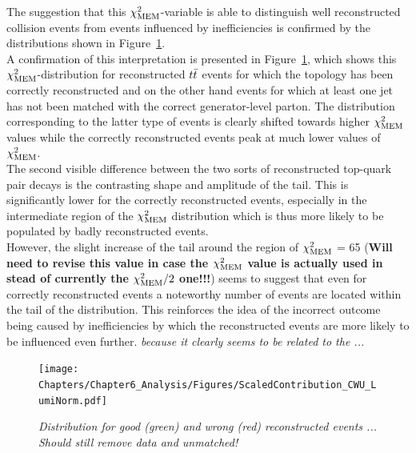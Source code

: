 The suggestion that this $\chi^{2}_{\textrm{MEM}}$-variable is able to distinguish well reconstructed collision events from events influenced by inefficiencies is confirmed by the distributions shown in Figure~\ref{fig::SMLikCorrVSWr}.
\\
A confirmation of this interpretation is presented in Figure~\ref{fig::SMLikCorrVSWr}, which shows this $\chi^{2}_{\textrm{MEM}}$-distribution for reconstructed $t\bar{t}$ events for which the topology has been correctly reconstructed and on the other hand events for which at least one jet has not been matched with the correct generator-level parton.
The distribution corresponding to the latter type of events is clearly shifted towards higher $\chi^{2}_{\textrm{MEM}}$ values while the correctly reconstructed events peak at much lower values of $\chi^{2}_{\textrm{MEM}}$.
\\
The second visible difference between the two sorts of reconstructed top-quark pair decays is the contrasting shape and amplitude of the tail.
This is significantly lower for the correctly reconstructed events, especially in the intermediate region of the $\chi^{2}_{\textrm{MEM}}$ distribution which is thus more likely to be populated by badly reconstructed events.
\\
However, the slight increase of the tail around the region of $\chi^{2}_{\textrm{MEM}}$ = 65 (\textbf{Will need to revise this value in case the $\chi^{2}_{\textrm{MEM}}$ value is actually used in stead of currently the $\chi^{2}_{\textrm{MEM}}/2$ one!!!}) seems to suggest that even for correctly reconstructed events a noteworthy number of events are located within the tail of the distribution. This reinforces the idea of the incorrect outcome being caused by inefficiencies by which the reconstructed events are more likely to be influenced even further. \textit{because it clearly seems to be related to the ...}
\\
\begin{figure}[h!t]
 \centering
 \texttt{[image: Chapters/Chapter6\_Analysis/Figures/ScaledContribution\_CWU\_LumiNorm.pdf]}
 \caption{\textit{Distribution for good (green) and wrong (red) reconstructed events ... Should still remove data and unmatched!}} \label{fig::SMLikCorrVSWr}
\end{figure}

